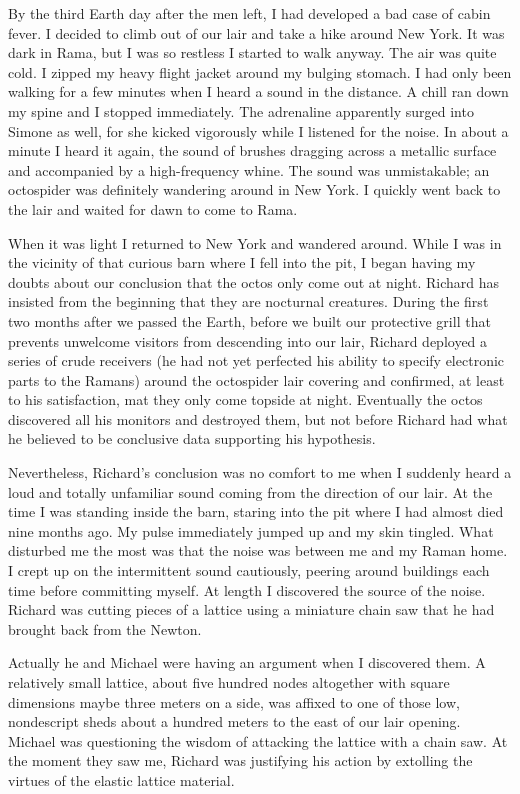 \documentclass[]{article}
\begin{document}
By the third Earth day after the men left, I had developed a bad case of cabin fever.  I decided to climb out of our lair and take a hike around New York.  It was dark in Rama, but I was so restless I started to walk anyway.  The air was quite cold.  I zipped my heavy flight jacket around my bulging stomach.  I had only been walking for a few minutes when I heard a sound in the distance.  A chill ran down my spine and I stopped immediately.  The adrenaline apparently surged into Simone as well, for she kicked vigorously while I listened for the noise.  In about a minute I heard it again, the sound of brushes dragging across a metallic surface and accompanied by a high-frequency whine.  The sound was unmistakable; an octospider was definitely wandering around in New York.  I quickly went back to the lair and waited for dawn to come to Rama.

When it was light I returned to New York and wandered around.  While I was in the vicinity of that curious barn where I fell into the pit, I began having my doubts about our conclusion that the octos only come out at night.  Richard has insisted from the beginning that they are nocturnal creatures.  During the first two months after we passed the Earth, before we built our protective grill that prevents unwelcome visitors from descending into our lair, Richard deployed a series of crude receivers (he had not yet perfected his ability to specify electronic parts to the Ramans) around the octospider lair covering and confirmed, at least to his satisfaction, mat they only come topside at night.  Eventually the octos discovered all his monitors and destroyed them, but not before Richard had what he believed to be conclusive data supporting his hypothesis.

Nevertheless, Richard’s conclusion was no comfort to me when I suddenly heard a loud and totally unfamiliar sound coming from the direction of our lair.  At the time I was standing inside the barn, staring into the pit where I had almost died nine months ago.  My pulse immediately jumped up and my skin tingled.  What disturbed me the most was that the noise was between me and my Raman home.  I crept up on the intermittent sound cautiously, peering around buildings each time before committing myself.  At length I discovered the source of the noise.  Richard was cutting pieces of a lattice using a miniature chain saw that he had brought back from the Newton.

Actually he and Michael were having an argument when I discovered them.  A relatively small lattice, about five hundred nodes altogether with square dimensions maybe three meters on a side, was affixed to one of those low, nondescript sheds about a hundred meters to the east of our lair opening.  Michael was questioning the wisdom of attacking the lattice with a chain saw.  At the moment they saw me, Richard was justifying his action by extolling the virtues of the elastic lattice material.
\end{document}
